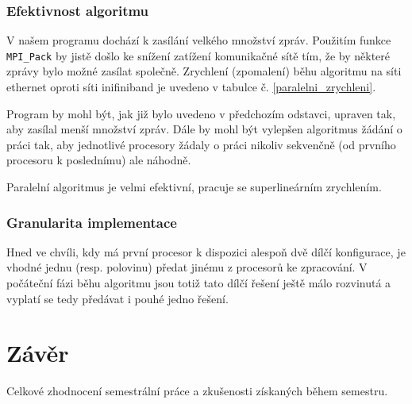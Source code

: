 \documentclass[12pt]{article}
\begin{document}
\subsubsection{Efektivnost algoritmu}
V našem programu dochází k zasílání velkého množství zpráv. Použitím funkce \texttt{MPI\_Pack} by jistě došlo ke snížení zatížení komunikačné sítě tím, že by některé zprávy bylo možné zasílat společně. Zrychlení (zpomalení) běhu algoritmu na síti ethernet oproti síti inifiniband je uvedeno v tabulce č. \ref{paralelni_zrychleni}.

Program by mohl být, jak již bylo uvedeno v předchozím odstavci, upraven tak, aby zasílal menší množství zpráv. Dále by mohl být vylepšen algoritmus žádání o práci tak, aby jednotlivé procesory žádaly o práci nikoliv sekvenčně (od prvního procesoru k poslednímu) ale náhodně.

Paralelní algoritmus je velmi efektivní, pracuje se superlineárním zrychlením. 

\subsubsection{Granularita implementace}

Hned ve chvíli, kdy má první procesor k dispozici alespoň dvě dílčí konfigurace, je vhodné jednu (resp. polovinu) předat jinému z procesorů ke zpracování. V počáteční fázi běhu algoritmu jsou totiž tato dílčí řešení ještě málo rozvinutá a vyplatí se tedy předávat i pouhé jedno řešení.

\section{Závěr}

Celkové zhodnocení semestrální práce a zkušenosti získaných během semestru.




       
\end{document}
